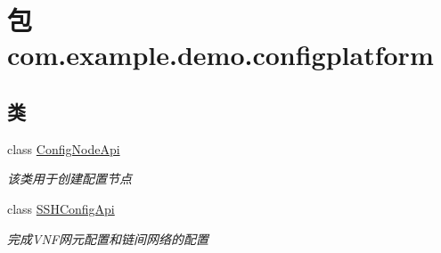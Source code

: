 \hypertarget{namespacecom_1_1example_1_1demo_1_1configplatform}{}\section{包 com.\+example.\+demo.\+configplatform}
\label{namespacecom_1_1example_1_1demo_1_1configplatform}
\subsection*{类}
\begin{DoxyCompactItemize}
\item 
class \mbox{\hyperlink{classcom_1_1example_1_1demo_1_1configplatform_1_1_config_node_api}{Config\+Node\+Api}}
\begin{DoxyCompactList}\small\item\em 该类用于创建配置节点 \end{DoxyCompactList}\item 
class \mbox{\hyperlink{classcom_1_1example_1_1demo_1_1configplatform_1_1_s_s_h_config_api}{S\+S\+H\+Config\+Api}}
\begin{DoxyCompactList}\small\item\em 完成\+V\+N\+F网元配置和链间网络的配置 \end{DoxyCompactList}\end{DoxyCompactItemize}
